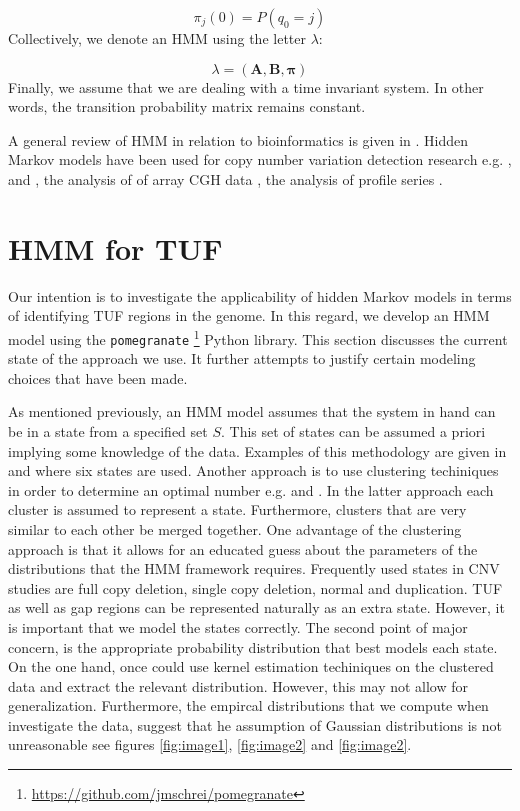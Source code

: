 \begin{equation}
\pi_j(0) = P(q_0 = j)
\end{equation}
Collectively, we denote an HMM using the letter $\lambda$:

\begin{equation}
\lambda = (\mathbf{A}, \mathbf{B}, \boldsymbol{\pi})
\label{hmm}
\end{equation}
Finally, we assume that we are dealing with a time invariant system. In other words, the transition probability matrix remains constant. 

A general review of HMM in relation to bioinformatics is given in \cite{koski}. Hidden Markov models have been used for copy number variation detection research e.g. \cite{coella2007},  \cite{Wang2007} and  \cite{cahan2008}, the analysis of of array CGH data \cite{fridlyand2004}, the analysis of profile series \cite{Sschliep2003}.


\section{HMM for TUF}
\label{hmm_tuf}

Our intention is to investigate the applicability of hidden Markov models in terms of identifying TUF regions in the genome. 
In this regard, we develop an HMM model using the \texttt{pomegranate} \footnote{\url{https://github.com/jmschrei/pomegranate}} Python library.
This section discusses the current state of the approach we use. It further attempts to justify certain modeling choices that have been made. 

As mentioned previously, an HMM model assumes that the system in hand can be in a state from a specified set $S$. This set of states can be assumed a priori implying some knowledge of the data. Examples of this methodology are given in \cite{coella2007} and \cite{Wang2007}  where six states are used. 
Another approach is to use clustering techiniques in order to determine an optimal number e.g. \cite{fridlyand2004} and \cite{liu2017}. In the latter approach each cluster is assumed to represent a state. Furthermore, clusters that are very similar to each other be merged together.  One advantage of the clustering approach is that it allows for an educated guess about the parameters of the distributions that the HMM framework requires. Frequently used states in CNV studies are full copy deletion, single copy deletion, normal and duplication. TUF as well as gap regions can be represented naturally as an extra state. However, it is important that we model the states correctly. The second point of major concern, is the appropriate probability distribution that best models each state. On the one hand, once could use kernel estimation techiniques on the clustered data and extract the relevant distribution. However, this may not allow for generalization. Furthermore, the empircal distributions that we compute when investigate the data, suggest that he assumption of Gaussian distributions is not unreasonable see figures \ref{fig:image1}, \ref{fig:image2} and \ref{fig:image2}.


